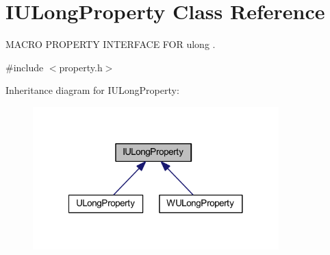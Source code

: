\hypertarget{class_i_u_long_property}{\section{I\-U\-Long\-Property Class Reference}
\label{class_i_u_long_property}
}


M\-A\-C\-R\-O P\-R\-O\-P\-E\-R\-T\-Y I\-N\-T\-E\-R\-F\-A\-C\-E F\-O\-R ulong .  




{\ttfamily \#include $<$property.\-h$>$}



Inheritance diagram for I\-U\-Long\-Property\-:
\nopagebreak
\begin{figure}[H]
\begin{center}
\leavevmode
\includegraphics[width=269pt]{class_i_u_long_property__inherit__graph}
\end{center}
\end{figure}
